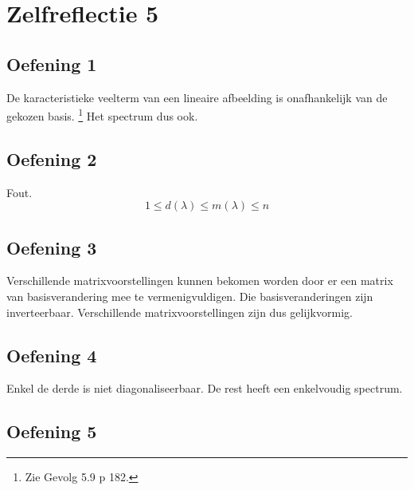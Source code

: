 \documentclass[lineaire_algebra_oplossingen.tex]{subfiles}
\begin{document}
\section{Zelfreflectie 5}
\subsection{Oefening 1}
De karacteristieke veelterm van een lineaire afbeelding is onafhankelijk van de gekozen basis. \footnote{Zie Gevolg 5.9 p 182.}
Het spectrum dus ook.

\subsection{Oefening 2}
Fout.
\[
1 \le d(\lambda) \le m(\lambda) \le n
\]

\subsection{Oefening 3}
Verschillende matrixvoorstellingen kunnen bekomen worden door er een matrix van basisverandering mee te vermenigvuldigen.
Die basisveranderingen zijn inverteerbaar. 
Verschillende matrixvoorstellingen zijn dus gelijkvormig.

\subsection{Oefening 4}
Enkel de derde is niet diagonaliseerbaar. De rest heeft een enkelvoudig spectrum.

\subsection{Oefening 5}
\end{document}
